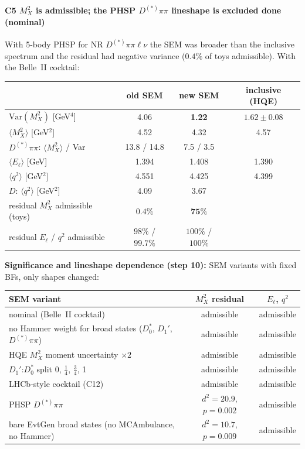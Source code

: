 \documentclass[11pt]{article}
\newcommand{\done}{\textcolor{done}{\textbf{done}}}
\begin{document}
\paragraph{C5 \quad $M_X^2$ is admissible; the PHSP $D^{(*)}\pi\pi$ lineshape is excluded \hfill \done{} (nominal)}
With 5-body PHSP for NR $D^{(*)}\pi\pi\ell\nu$ the SEM was broader than the inclusive spectrum and the residual had
negative variance ($0.4\%$ of toys admissible). With the Belle~II cocktail:

\begin{center}\small
\begin{tabular}{lccc}
\toprule
 & old SEM & new SEM & inclusive (HQE) \\
\midrule
$\mathrm{Var}(M_X^2)$ [GeV$^4$] & 4.06 & \textbf{1.22} & $1.62\pm0.08$ \\
$\langle M_X^2\rangle$ [GeV$^2$] & 4.52 & 4.32 & 4.57 \\
$D^{(*)}\pi\pi$: $\langle M_X^2\rangle$ / Var & 13.8 / 14.8 & 7.5 / 3.5 & \\
$\langle E_\ell\rangle$ [GeV] & 1.394 & 1.408 & 1.390 \\
$\langle q^2\rangle$ [GeV$^2$] & 4.551 & 4.425 & 4.399 \\
$D$: $\langle q^2\rangle$ [GeV$^2$] & 4.09 & 3.67 & \\
\midrule
residual $M_X^2$ admissible (toys) & $0.4\%$ & $\mathbf{75\%}$ & \\
residual $E_\ell$ / $q^2$ admissible & $98\%$ / $99.7\%$ & $100\%$ / $100\%$ & \\
\bottomrule
\end{tabular}
\end{center}
\textbf{Significance and lineshape dependence (step 10):} SEM variants with fixed BFs, only shapes changed:
\begin{center}\small
\begin{tabular}{>{\raggedright\arraybackslash}p{8.6cm}cc}
\toprule
SEM variant & $M_X^2$ residual & $E_\ell$, $q^2$ \\
\midrule
nominal (Belle~II cocktail) & admissible & admissible \\
no Hammer weight for broad states ($D_0^*$, $D_1'$, $D^{(*)}\pi\pi$) & admissible & admissible \\
HQE $M_X^2$ moment uncertainty $\times2$ & admissible & admissible \\
$D_1'$:$D_0^*$ split 0, $\frac14$, $\frac34$, 1 & admissible & admissible \\
LHCb-style cocktail (C12) & admissible & admissible \\
\midrule
PHSP $D^{(*)}\pi\pi$ & $d^2=20.9$, $p=0.002$ & admissible \\
bare EvtGen broad states (no MCAmbulance, no Hammer) & $d^2=10.7$, $p=0.009$ & admissible \\
\bottomrule
\end{tabular}
\end{center}
\end{document}
